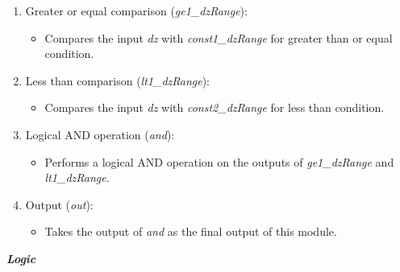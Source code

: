 \begin{enumerate}

\item Greater or equal comparison (\textit{ge1\_dzRange}):
\begin{itemize}
\item Compares the input \textit{dz} with \textit{const1\_dzRange} for greater than or equal condition.
\end{itemize}

\item Less than comparison (\textit{lt1\_dzRange}):
\begin{itemize}
\item Compares the input \textit{dz} with \textit{const2\_dzRange} for less than condition.
\end{itemize}

\item Logical AND operation (\textit{and}):
\begin{itemize}
\item Performs a logical AND operation on the outputs of \textit{ge1\_dzRange} and \textit{lt1\_dzRange}.
\end{itemize}

\item Output (\textit{out}):
\begin{itemize}
\item Takes the output of \textit{and} as the final output of this module.
\end{itemize}

\end{enumerate}

\vspace{0.5cm}

\textbf{\textit{Logic}}

